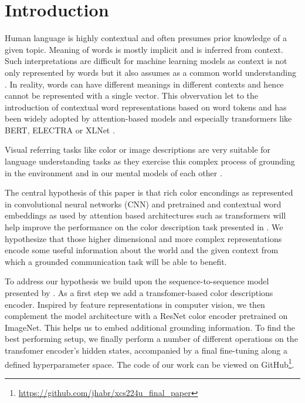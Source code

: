 \section{Introduction}

Human language is highly contextual and often presumes prior knowledge of a given topic. Meaning of words is mostly implicit and is inferred from context. Such interpretations are difficult for machine learning models as context is not only represented by words but it also assumes as a common world understanding \citep{monroe-2017-colors}. In reality, words can have different meanings in different contexts and hence cannot be represented with a single vector. This obvervation let to the introduction of contextual word representations based on word tokens and has been widely adopted by attention-based models and especially transformers like BERT, ELECTRA or XLNet \citep{smith-2019-contextual,vaswani-2017-attention}.

\par
Visual referring tasks like color or image descriptions are very suitable for language understanding tasks as they exercise this complex process of grounding in the environment and in our mental models of each other \citep{monroe-2017-colors, karpathy-2014-image_descriptions}.

\par
The central hypothesis of this paper is that rich color encondings as represented in convolutional neural networks (CNN) and pretrained and contextual word embeddings as used by attention based architectures such as transformers will help improve the performance on the color description task presented in \citep{monroe-2017-colors}. We hypothesize that those higher dimensional and more complex representations encode some useful information about the world and the given context from which a grounded communication task will be able to benefit.

\par
To address our hypothesis we build upon the sequence-to-sequence model presented by \citep{monroe-2017-colors}. As a first step we add a transfomer-based color descriptions encoder. Inspired by feature representations in computer vision, we then complement the model architecture with a ResNet color encoder pretrained on ImageNet. This helps us to embed additional grounding information. To find the best performing setup, we finally perform a number of different operations on the transfomer encoder's hidden states, accompanied by a final fine-tuning along a defined hyperparameter space. The code of our work can be viewed on GitHub\footnote{\url{https://github.com/jhabr/xcs224u_final_paper}}.
